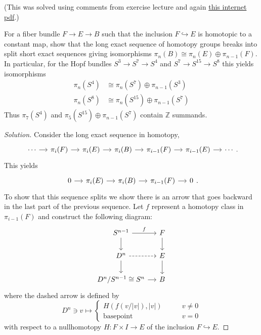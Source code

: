\documentclass{article}
\numberwithin{equation}{section}
\newcommand{\Z}{\mathbb{Z}}
\begin{document}
\begin{exercise}[4.2.31]
	(This was solved using comments from exercise lecture and again \href{https://pages.uoregon.edu/njp/hw7solutions.pdf}{this internet pdf}.)

	For a fiber bundle $F\to E\to B$ such that the inclusion $F\hookrightarrow E$ is homotopic to a constant map, show that the long exact sequence of homotopy groups breaks into split short exact sequences giving isomorphisms $\pi_n(B)\cong \pi_n(E)\oplus\pi_{n-1}(F)$. In particular, for the Hopf bundles $S^3\to S^7\to S^4$ and $S^7\to S^{15}\to S^8$  this yields isomorphisms
	\begin{align*}
		\pi_n(S^4)&\cong \pi_n(S^7)\oplus\pi_{n-1}(S^3)\\
		\pi_n(S^8)&\cong \pi_n(S^{15})\oplus\pi_{n-1}(S^7)
	\end{align*}
	Thus $\pi_{7}(S^4)$ and $\pi_{5}(S^{15})\oplus\pi_{n-1}(S^7)$  contain $\Z$  summands.	
\end{exercise}
\begin{proof}[Solution]
	Consider the long exact sequence in homotopy,
	\[
		\begin{tikzcd}[column sep=small]
				\cdots\arrow[r]&\pi_i(F)\arrow[r]&\pi_i(E)\arrow[r]&\pi_i(B)\arrow[r]&\pi_{i-1}(F)\arrow[r]&\pi_{i-1}(E)\arrow[r]&\cdots
		\end{tikzcd}
	.\]
This yields
\[
\begin{tikzcd}[column sep=small]
	0\arrow[r]&\pi_i(E)\arrow[r]&\pi_i(B)\arrow[r]&\pi_{i-1}(F)\arrow[r]&0
\end{tikzcd}
.\]
To show that this sequence splits we show there is an arrow that goes backward in the last part of the previous sequence. Let $f$ represent a homotopy class in $\pi_{i-1}(F)$ and construct the following diagram:
\[\begin{tikzcd}[column sep=small]
	S^{n-1}\arrow[r,"f"]\arrow[d]&F\arrow[d]\\
	D^n\arrow[d]\arrow[r,dashed]&E\arrow[d]\\
	D^n/S^{n-1}\cong S^n\arrow[r]&B
\end{tikzcd}\]
where the dashed arrow is defined by
\[D^{n} \ni v\mapsto \begin{cases}
	H(f(v/|v|),|v|)\qquad &v\neq 0\\
	\text{basepoint} \qquad &v=0
\end{cases}\]
with respect to a nullhomotopy $H:F\times I\to E$ of the inclusion $F\hookrightarrow E$.
\end{proof}
\end{document}
